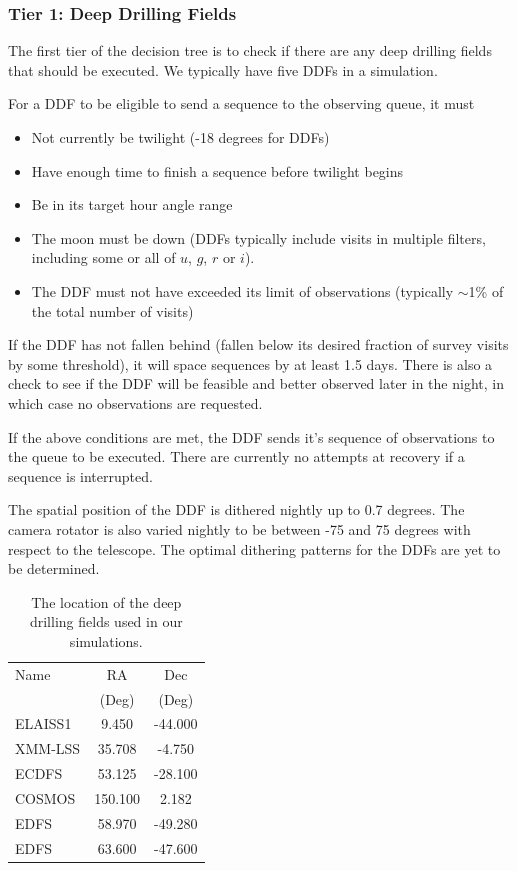 \subsubsection{Tier 1:  Deep Drilling Fields}

The first tier of the decision tree is to check if there are any deep drilling fields that should be executed. We typically have five DDFs in a simulation. 

For a DDF to be eligible to send a sequence to the observing queue, it must
\begin{itemize}
\item{Not currently be twilight (-18 degrees for DDFs)}
\item{Have enough time to finish a sequence before twilight begins}
\item{Be in its target hour angle range}
\item{The moon must be down (DDFs typically include visits in multiple filters, including some or all of $u$, $g$, $r$ or $i$). }
\item{The DDF must not have exceeded its limit of observations (typically $\sim$1\% of the total number of visits)}
\end{itemize}

If the DDF has not fallen behind (fallen below its desired fraction of survey visits by some threshold), it will space sequences by at least 1.5 days. There is also a check to see if the DDF will be feasible and better observed later in the night, in which case no observations are requested.

If the above conditions are met, the DDF sends it's sequence of observations to the queue to be executed. There are currently no attempts at recovery if a sequence is interrupted. 

The spatial position of the DDF is dithered nightly up to 0.7 degrees.  The camera rotator is also varied nightly to be between -75 and 75 degrees with respect to the telescope. The optimal dithering patterns for the DDFs are yet to be determined.

\begin{table}
\begin{centering}
\begin{tabular}{lcc}
\toprule
    Name &      RA &     Dec \\
    &          (Deg) &  (Deg) \\
    \hline
 ELAISS1 &   9.450 & -44.000 \\
 XMM-LSS &  35.708 &  -4.750 \\
   ECDFS &  53.125 & -28.100 \\
  COSMOS & 150.100 &   2.182 \\
    EDFS &  58.970 & -49.280 \\
    EDFS &  63.600 & -47.600 \\
    \hline
\end{tabular}
\caption{The location of the deep drilling fields used in our simulations.}\label{table:ddfs}
\end{centering}
\end{table}



